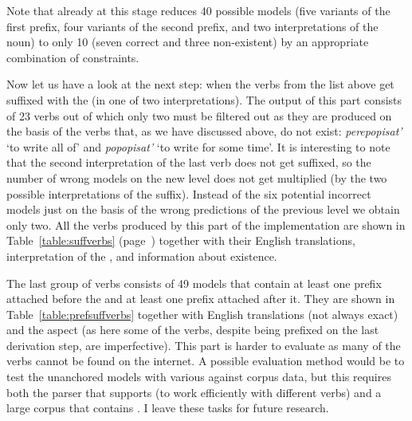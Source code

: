 Note that already at this stage  reduces 40 possible models (five variants of the first prefix, four variants of the second prefix, and two interpretations of the noun) to only 10 (seven correct and three non-existent) by an appropriate combination of constraints. 

Now let us have a look at the next step: when the verbs from the list above get suffixed with the  (in one of two interpretations). The output of this part consists of 23 verbs out of which only two must be filtered out as they are produced on the basis of the verbs that, as we have discussed above, do not exist: \textit{perepopisat'} `to write all of' and \textit{popopisat'} `to write for some time'. It is interesting to note that the second interpretation of the last verb does not get suffixed, so the number of wrong models on the new level does not get multiplied (by the two possible interpretations of the suffix). Instead of the six potential incorrect models just on the basis of the wrong predictions of the previous level we obtain only two. All the verbs produced by this part of the implementation are shown in Table~\ref{table:suffverbs} (page~\pageref{table:suffverbs}) together with their English translations, interpretation of the , and information about existence.

The last group of verbs consists of 49 models that contain at least one prefix attached before the  and at least one prefix attached after it. They are shown in Table~\ref{table:prefsuffverbs} together with English translations (not always exact) and the aspect (as here some of the verbs, despite being prefixed on the last derivation step, are imperfective). This part is harder to evaluate as many of the verbs cannot be found on the internet. A possible evaluation method would be to test the unanchored models with various  against corpus data, but this requires both the parser that supports  (to work efficiently with different verbs) and a large corpus that contains . I leave these tasks for future research.
 
